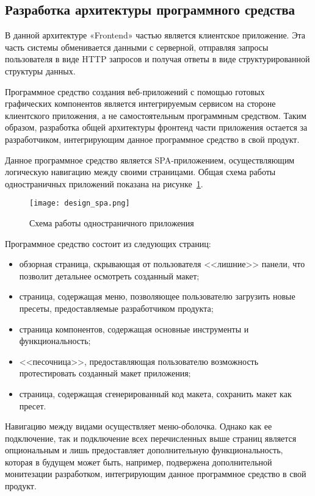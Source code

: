 \subsection{Разработка архитектуры программного средства}
\label{sec:modeling:sequence_diagram}

В данной архитектуре «Frontend» частью является клиентское приложение. Эта часть системы обменивается данными с серверной, отправляя запросы пользователя в виде HTTP запросов и получая ответы в виде структурированной структуры данных. 

Программное средство создания веб-приложений с помощью готовых графических компонентов является интегрируемым сервисом на стороне клиентского приложения, а не самостоятельным программным средством. Таким образом, разработка общей архитектуры фронтенд части приложения остается за разработчиком, интегрирующим данное программное средство в свой продукт.

Данное программное средство является SPA-приложением, осуществляющим логическую навигацию между своими страницами. Общая схема работы одностраничных приложений показана на рисунке~\ref{sec:design:spa}.\pagebreak
\begin{figure}[ht]
\centering
    \texttt{[image: design\_spa.png]}
    \caption{Схема работы одностраничного приложения}
    \label{sec:design:spa}
\end{figure}

Программное средство состоит из следующих страниц:

\begin{itemize}
    \item обзорная страница, скрывающая от пользователя <<лишние>> панели, что позволит детальнее осмотреть созданный макет;
    \item страница, содержащая меню, позволяющее пользователю загрузить новые пресеты, предоставляемые разработчиком продукта;
    \item страница компонентов, содержащая основные инструменты и функциональность;
    \item <<песочница>>, предоставляющая пользователю возможность протестировать созданный макет приложения;
    \item страница, содержащая сгенерированный код макета, сохранить макет как пресет.
\end{itemize}

Навигацию между видами осуществляет меню-оболочка. Однако как ее подключение, так и подключение всех перечисленных выше страниц является опциональным и лишь предоставляет дополнительную функциональность, которая в будущем может быть, например, подвержена дополнительной монитезации разработком, интегрирующим данное программное средство в свой продукт.

